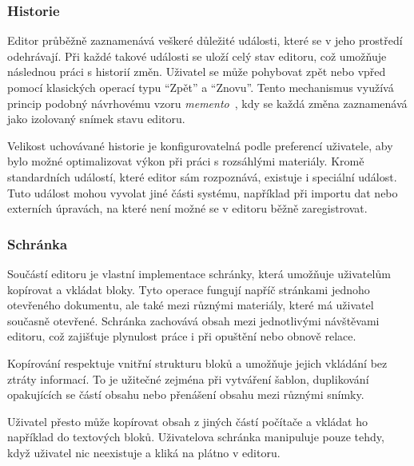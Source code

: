 

\subsubsection{Historie}

Editor průběžně zaznamenává veškeré důležité události, které se v jeho prostředí odehrávají. 
Při každé takové události se uloží celý stav editoru, což umožňuje následnou práci s historií změn. 
Uživatel se může pohybovat zpět nebo vpřed pomocí klasických operací typu \enquote{Zpět} a \enquote{Znovu}. Tento mechanismus využívá princip podobný návrhovému vzoru \emph{memento}~, kdy se každá změna zaznamenává jako izolovaný snímek stavu editoru.

Velikost uchovávané historie je konfigurovatelná podle preferencí uživatele, aby bylo možné optimalizovat výkon při práci s rozsáhlými materiály. 
Kromě standardních událostí, které editor sám rozpoznává, existuje i speciální událost.
Tuto událost mohou vyvolat jiné části systému, například při importu dat nebo externích úpravách, na které není možné se v editoru běžně zaregistrovat.

\subsubsection{Schránka}

Součástí editoru je vlastní implementace schránky, která umožňuje uživatelům kopírovat a vkládat bloky. 
Tyto operace fungují napříč stránkami jednoho otevřeného dokumentu, ale také mezi různými materiály, které má uživatel současně otevřené. 
Schránka zachovává obsah mezi jednotlivými návštěvami editoru, což zajišťuje plynulost práce i při opuštění nebo obnově relace.

Kopírování respektuje vnitřní strukturu bloků a umožňuje jejich vkládání bez ztráty informací. 
To je užitečné zejména při vytváření šablon, duplikování opakujících se částí obsahu nebo přenášení obsahu mezi různými snímky.

Uživatel přesto může kopírovat obsah z jiných částí počítače a vkládat ho například do textových bloků.
Uživatelova schránka manipuluje pouze tehdy, když uživatel nic neexistuje a kliká na plátno v editoru.

